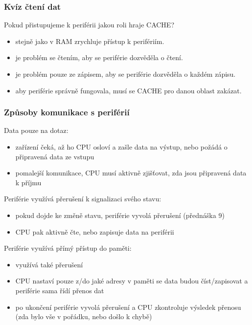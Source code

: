 \documentclass{beamer}
\begin{document}
\begin{frame}
\frametitle{Kvíz čtení dat}

Pokud přistupujeme k periférii jakou roli hraje CACHE?
\begin{itemize}
\item[A] stejně jako v RAM zrychluje přístup k perifériím.
\item[B] je problém se čtením, aby se periférie dozvěděla o čtení.
\item[C] je problém pouze ze zápisem, aby se periférie dozvěděla o každém zápisu.
\item[D] aby periférie správně fungovala, musí se CACHE pro danou oblast zakázat.
\end{itemize}
\end{frame}



\begin{frame}
\frametitle{Způsoby komunikace s periférií}
Data pouze na dotaz:
\begin{itemize}
\item zařízení čeká, až ho CPU osloví a zašle data na výstup, nebo požádá o připravená data ze vstupu
\item pomalejší komunikace, CPU musí aktivně zjišťovat, zda jsou připravená data k příjmu
\end{itemize}

Periférie využívá přerušení k signalizaci svého stavu:
\begin{itemize}
\item pokud dojde ke změně stavu, periférie vyvolá přerušení (přednáška 9)
\item CPU pak aktivně čte, nebo zapisuje data na periférii
\end{itemize}

Periférie využívá přímý přístup do paměti:
\begin{itemize}
\item využívá také přerušení
\item CPU nastaví pouze z/do jaké adresy v paměti se data budou číst/zapisovat a periférie sama řídí přenos dat
\item po ukončení periférie vyvolá přerušení a CPU zkontroluje výsledek přenosu (zda bylo vše v pořádku, nebo došlo k chybě)
\end{itemize}

\end{frame}
\end{document}
